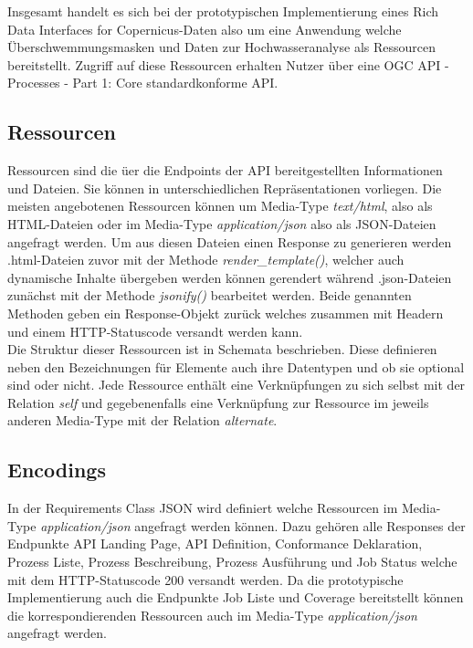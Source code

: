 Insgesamt handelt es sich bei der prototypischen Implementierung eines Rich Data Interfaces for Copernicus-Daten also um eine Anwendung welche Überschwemmungsmasken und Daten zur Hochwasseranalyse als Ressourcen bereitstellt.
Zugriff auf diese Ressourcen erhalten Nutzer über eine OGC API - Processes - Part 1: Core standardkonforme API. 

\subsection{Ressourcen}
Ressourcen sind die üer die Endpoints der API bereitgestellten Informationen und Dateien. Sie können in unterschiedlichen Repräsentationen vorliegen.
Die meisten angebotenen Ressourcen können um Media-Type \textit{text/html}, also als HTML-Dateien oder im Media-Type \textit{application/json} also als 
JSON-Dateien angefragt werden. Um aus diesen Dateien einen Response zu generieren werden .html-Dateien zuvor mit der Methode \textit{render\_template()}, welcher auch 
dynamische Inhalte übergeben werden können gerendert während .json-Dateien zunächst mit der Methode \textit{jsonify()} bearbeitet werden. Beide genannten Methoden
geben ein Response-Objekt zurück welches zusammen mit Headern und einem HTTP-Statuscode versandt werden kann. \\

Die Struktur dieser Ressourcen ist in Schemata beschrieben. Diese definieren neben den Bezeichnungen für Elemente auch ihre Datentypen und 
ob sie optional sind oder nicht. Jede Ressource enthält eine Verknüpfungen zu sich selbst mit der Relation \textit{self} und gegebenenfalls eine Verknüpfung 
zur Ressource im jeweils anderen Media-Type mit der Relation \textit{alternate}. 

\subsection{Encodings}
In der Requirements Class JSON wird definiert welche Ressourcen im Media-Type \textit{application/json} angefragt werden können. Dazu gehören alle Responses der 
Endpunkte API Landing Page, API Definition, Conformance Deklaration, Prozess Liste, Prozess Beschreibung, Prozess Ausführung und Job Status welche mit dem 
HTTP-Statuscode 200 versandt werden. Da die prototypische Implementierung auch die Endpunkte Job Liste und Coverage bereitstellt können die korrespondierenden
Ressourcen auch im Media-Type \textit{application/json} angefragt werden.\\

